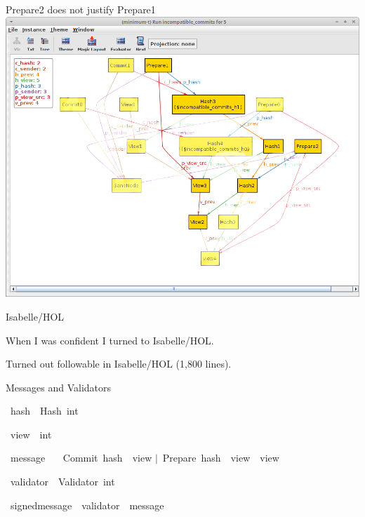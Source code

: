 \documentclass{beamer}
\begin{document}
\begin{frame}{Prepare2 does not justify Prepare1}
\includegraphics[width=\textwidth]{fork3.png}
\end{frame}

\begin{frame}{Isabelle/HOL}

When I was confident I turned to Isabelle/HOL.

\vfill

\alert{Turned out followable in Isabelle/HOL (1,800 lines).}
\end{frame}

\renewcommand\isacharbar{$\mid$}

\begin{frame}{Messages and Validators}

\isamarkupfalse%
\ hash\ {\isacharequal}\ Hash\ int%

\isamarkupfalse%
\ view\ {\isacharequal}\ int%

\isamarkupfalse%
\ message\ {\isacharequal}\isanewline
\ \ Commit\ {\isachardoublequoteopen}hash\ {\isacharasterisk}\ view{\isachardoublequoteclose}\isanewline
{\isacharbar}\ Prepare\ {\isachardoublequoteopen}hash\ {\isacharasterisk}\ view\ {\isacharasterisk}\ view{\isachardoublequoteclose}%

\isamarkupfalse%
\ validator\ {\isacharequal}\ Validator\ int%

\isamarkupfalse%
\ signed{\isacharunderscore}message\ {\isacharequal}\ {\isachardoublequoteopen}validator\ {\isacharasterisk}\ message{\isachardoublequoteclose}%
\end{frame}
\end{document}
